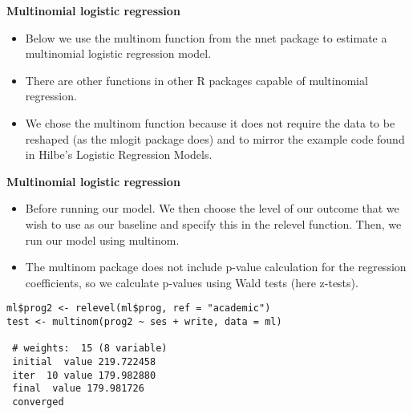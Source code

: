 \documentclass[00-GLMregslides.tex]{subfiles}
\begin{document}
\begin{frame}[fragile]

\textbf{Multinomial logistic regression}
\begin{itemize}
\item 
Below we use the multinom function from the nnet package to estimate a multinomial logistic regression model. 
\item There are other functions in other R packages capable of multinomial regression. 
\item
  We chose the multinom function because it does not require the data to be reshaped (as the mlogit package does) and to mirror the example code found in Hilbe's Logistic Regression Models.
\end{itemize}
\end{frame}
 \begin{frame}[fragile]
 	
 	\textbf{Multinomial logistic regression}
 	\begin{itemize}
 		\item 
  
Before running our model. We then choose the level of our outcome that we wish to use as our baseline and specify this in the relevel function. Then, we run our model using multinom. 
\item The multinom package does not include p-value calculation for the regression coefficients, so we calculate p-values using Wald tests (here z-tests).
 
\end{itemize}
\end{frame}
\begin{frame}[fragile]

\begin{framed}
	\begin{verbatim}
ml$prog2 <- relevel(ml$prog, ref = "academic")
test <- multinom(prog2 ~ ses + write, data = ml)
 
 # weights:  15 (8 variable)
 initial  value 219.722458 
 iter  10 value 179.982880
 final  value 179.981726 
 converged
\end{verbatim}
\end{framed}
\end{frame}
\end{document}
